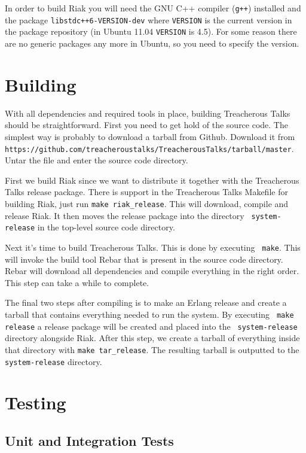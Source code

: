 \documentclass[11pt,a4paper]{report}
\begin{document}
In order to build Riak you will need the GNU C++ compiler ({\tt g++}) installed
and the package {\tt libstdc++6-VERSION-dev} where {\tt VERSION} is the current
version in the package repository (in Ubuntu 11.04 {\tt VERSION} is 4.5). For
some reason there are no generic packages any more in Ubuntu, so you need to
specify the version.
\section{Building}
With all dependencies and required tools in place, building Treacherous Talks
should be straightforward. First you need to get hold of the source code. The
simplest way is probably to download a tarball from Github. Download it from {\tt
  https://github.com/treacheroustalks/Treacherous\-Talks/tarball/master}.  Untar
the file and enter the source code directory.

First we build Riak since we want to distribute it together with the Treacherous
Talks release package. There is support in the Treacherous Talks Makefile for
building Riak, just run {\tt make riak\_release}. This will download, compile
and release Riak. It then moves the release package into the directory {\tt
  system-release} in the top-level source code directory.

Next it's time to build Treacherous Talks. This is done by executing {\tt
  make}. This will invoke the build tool Rebar that is present in the source
code directory. Rebar will download all dependencies and compile everything in
the right order. This step can take a while to complete.

The final two steps after compiling is to make an Erlang release and create a
tarball that contains everything needed to run the system. By executing {\tt
  make release} a release package will be created and placed into the {\tt
  system-release} directory alongside Riak. After this step, we create a tarball
of everything inside that directory with {\tt make tar\_release}. The resulting
tarball is outputted to the {\tt system-release} directory.

\section{Testing}

\subsection{Unit and Integration Tests}
\end{document}
